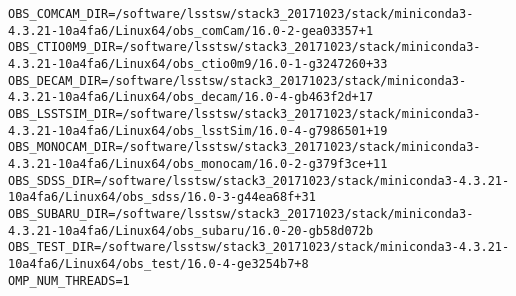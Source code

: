 \begin{verbatim}
OBS_COMCAM_DIR=/software/lsstsw/stack3_20171023/stack/miniconda3-4.3.21-10a4fa6/Linux64/obs_comCam/16.0-2-gea03357+1
OBS_CTIO0M9_DIR=/software/lsstsw/stack3_20171023/stack/miniconda3-4.3.21-10a4fa6/Linux64/obs_ctio0m9/16.0-1-g3247260+33
OBS_DECAM_DIR=/software/lsstsw/stack3_20171023/stack/miniconda3-4.3.21-10a4fa6/Linux64/obs_decam/16.0-4-gb463f2d+17
OBS_LSSTSIM_DIR=/software/lsstsw/stack3_20171023/stack/miniconda3-4.3.21-10a4fa6/Linux64/obs_lsstSim/16.0-4-g7986501+19
OBS_MONOCAM_DIR=/software/lsstsw/stack3_20171023/stack/miniconda3-4.3.21-10a4fa6/Linux64/obs_monocam/16.0-2-g379f3ce+11
OBS_SDSS_DIR=/software/lsstsw/stack3_20171023/stack/miniconda3-4.3.21-10a4fa6/Linux64/obs_sdss/16.0-3-g44ea68f+31
OBS_SUBARU_DIR=/software/lsstsw/stack3_20171023/stack/miniconda3-4.3.21-10a4fa6/Linux64/obs_subaru/16.0-20-gb58d072b
OBS_TEST_DIR=/software/lsstsw/stack3_20171023/stack/miniconda3-4.3.21-10a4fa6/Linux64/obs_test/16.0-4-ge3254b7+8
OMP_NUM_THREADS=1

\end{verbatim}
